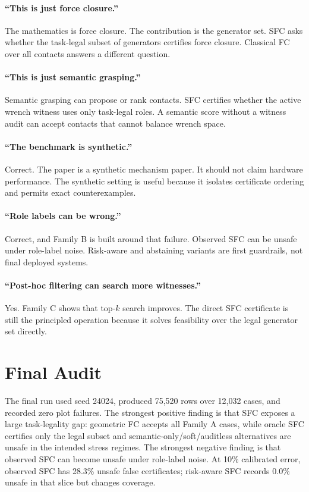 \documentclass{article}
\begin{document}
\paragraph{``This is just force closure.''}
The mathematics is force closure. The contribution is the generator set. SFC asks whether the task-legal subset of generators certifies force closure. Classical FC over all contacts answers a different question.

\paragraph{``This is just semantic grasping.''}
Semantic grasping can propose or rank contacts. SFC certifies whether the active wrench witness uses only task-legal roles. A semantic score without a witness audit can accept contacts that cannot balance wrench space.

\paragraph{``The benchmark is synthetic.''}
Correct. The paper is a synthetic mechanism paper. It should not claim hardware performance. The synthetic setting is useful because it isolates certificate ordering and permits exact counterexamples.

\paragraph{``Role labels can be wrong.''}
Correct, and Family B is built around that failure. Observed SFC can be unsafe under role-label noise. Risk-aware and abstaining variants are first guardrails, not final deployed systems.

\paragraph{``Post-hoc filtering can search more witnesses.''}
Yes. Family C shows that top-\(k\) search improves. The direct SFC certificate is still the principled operation because it solves feasibility over the legal generator set directly.

\section{Final Audit}

The final run used seed 24024, produced 75,520 rows over 12,032 cases, and recorded zero plot failures. The strongest positive finding is that SFC exposes a large task-legality gap: geometric FC accepts all Family A cases, while oracle SFC certifies only the legal subset and semantic-only/soft/auditless alternatives are unsafe in the intended stress regimes. The strongest negative finding is that observed SFC can become unsafe under role-label noise. At 10\% calibrated error, observed SFC has 28.3\% unsafe false certificates; risk-aware SFC records 0.0\% unsafe in that slice but changes coverage.
\end{document}
